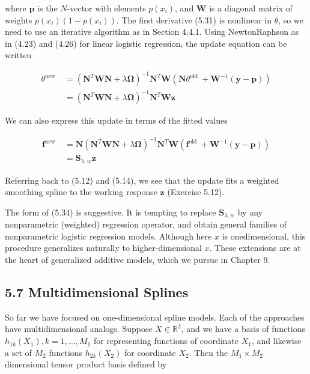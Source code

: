 \documentclass[10pt]{article}
\begin{document}
where $\mathbf{p}$ is the $N$-vector with elements $p\left(x_{i}\right)$, and $\mathbf{W}$ is a diagonal matrix of weights $p\left(x_{i}\right)\left(1-p\left(x_{i}\right)\right)$. The first derivative (5.31) is nonlinear in $\theta$, so we need to use an iterative algorithm as in Section 4.4.1. Using NewtonRaphson as in (4.23) and (4.26) for linear logistic regression, the update equation can be written


\begin{align*}
\theta^{\text {new }} & =\left(\mathbf{N}^{T} \mathbf{W N}+\lambda \boldsymbol{\Omega}\right)^{-1} \mathbf{N}^{T} \mathbf{W}\left(\mathbf{N} \theta^{\text {old }}+\mathbf{W}^{-1}(\mathbf{y}-\mathbf{p})\right) \\
& =\left(\mathbf{N}^{T} \mathbf{W N}+\lambda \boldsymbol{\Omega}\right)^{-1} \mathbf{N}^{T} \mathbf{W} \mathbf{z} \tag{5.33}
\end{align*}


We can also express this update in terms of the fitted values


\begin{align*}
\mathbf{f}^{\text {new }} & =\mathbf{N}\left(\mathbf{N}^{T} \mathbf{W} \mathbf{N}+\lambda \boldsymbol{\Omega}\right)^{-1} \mathbf{N}^{T} \mathbf{W}\left(\mathbf{f}^{\text {old }}+\mathbf{W}^{-1}(\mathbf{y}-\mathbf{p})\right) \\
& =\mathbf{S}_{\lambda, w} \mathbf{z} \tag{5.34}
\end{align*}


Referring back to (5.12) and (5.14), we see that the update fits a weighted smoothing spline to the working response $\mathbf{z}$ (Exercise 5.12).

The form of (5.34) is suggestive. It is tempting to replace $\mathbf{S}_{\lambda, w}$ by any nonparametric (weighted) regression operator, and obtain general families of nonparametric logistic regression models. Although here $x$ is onedimensional, this procedure generalizes naturally to higher-dimensional $x$. These extensions are at the heart of generalized additive models, which we pursue in Chapter 9.

\subsection*{5.7 Multidimensional Splines}
So far we have focused on one-dimensional spline models. Each of the approaches have multidimensional analogs. Suppose $X \in \mathbb{R}^{2}$, and we have a basis of functions $h_{1 k}\left(X_{1}\right), k=1, \ldots, M_{1}$ for representing functions of coordinate $X_{1}$, and likewise a set of $M_{2}$ functions $h_{2 k}\left(X_{2}\right)$ for coordinate $X_{2}$. Then the $M_{1} \times M_{2}$ dimensional tensor product basis defined by
\end{document}
